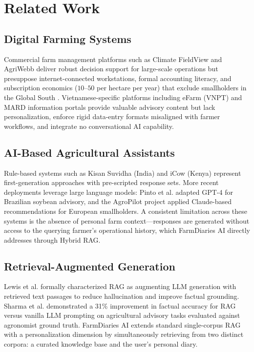 \documentclass[conference]{IEEEtran}
\begin{document}
\section{Related Work}

\subsection{Digital Farming Systems}

Commercial farm management platforms such as Climate FieldView and AgriWebb deliver robust decision support for large-scale operations but presuppose internet-connected workstations, formal accounting literacy, and subscription economics ($10$--$50$ per hectare per year) that exclude smallholders in the Global South \cite{kamilaris2018}. Vietnamese-specific platforms including eFarm (VNPT) and MARD information portals provide valuable advisory content but lack personalization, enforce rigid data-entry formats misaligned with farmer workflows, and integrate no conversational AI capability.

\subsection{AI-Based Agricultural Assistants}

Rule-based systems such as Kisan Suvidha (India) and iCow (Kenya) represent first-generation approaches with pre-scripted response sets. More recent deployments leverage large language models: Pinto et al. \cite{pinto2023} adapted GPT-4 for Brazilian soybean advisory, and the AgroPilot project applied Claude-based recommendations for European smallholders. A consistent limitation across these systems is the absence of personal farm context---responses are generated without access to the querying farmer's operational history, which FarmDiaries AI directly addresses through Hybrid RAG.

\subsection{Retrieval-Augmented Generation}

Lewis et al. \cite{lewis2020} formally characterized RAG as augmenting LLM generation with retrieved text passages to reduce hallucination and improve factual grounding. Sharma et al. \cite{sharma2023} demonstrated a 31\% improvement in factual accuracy for RAG versus vanilla LLM prompting on agricultural advisory tasks evaluated against agronomist ground truth. FarmDiaries AI extends standard single-corpus RAG with a personalization dimension by simultaneously retrieving from two distinct corpora: a curated knowledge base and the user's personal diary.
\end{document}
